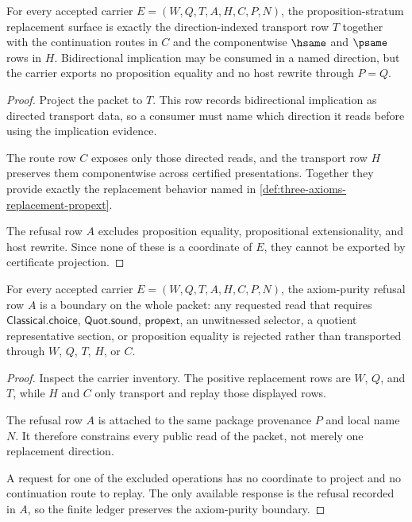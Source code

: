 \begin{theorem}
\label{thm:effective-replacement-ledger-propext-transport-row}
For every accepted carrier $E=(W,Q,T,A,H,C,P,N)$, the proposition-stratum replacement surface is exactly the direction-indexed transport row $T$ together with the continuation routes in $C$ and the componentwise $\hsame$ and $\psame$ rows in $H$. Bidirectional implication may be consumed in a named direction, but the carrier exports no proposition equality and no host rewrite through $P=Q$.
\end{theorem}
\begin{proof}
Project the packet to $T$. This row records bidirectional implication as directed transport data, so a consumer must name which direction it reads before using the implication evidence.

The route row $C$ exposes only those directed reads, and the transport row $H$ preserves them componentwise across certified presentations. Together they provide exactly the replacement behavior named in \autoref{def:three-axioms-replacement-propext}.

The refusal row $A$ excludes proposition equality, propositional extensionality, and host rewrite. Since none of these is a coordinate of $E$, they cannot be exported by certificate projection.
\end{proof}

\begin{theorem}
\label{thm:effective-replacement-ledger-axiom-purity-boundary}
For every accepted carrier $E=(W,Q,T,A,H,C,P,N)$, the axiom-purity refusal row $A$ is a boundary on the whole packet: any requested read that requires $\mathsf{Classical.choice}$, $\mathsf{Quot.sound}$, $\mathsf{propext}$, an unwitnessed selector, a quotient representative section, or proposition equality is rejected rather than transported through $W$, $Q$, $T$, $H$, or $C$.
\end{theorem}
\begin{proof}
Inspect the carrier inventory. The positive replacement rows are $W$, $Q$, and $T$, while $H$ and $C$ only transport and replay those displayed rows.

The refusal row $A$ is attached to the same package provenance $P$ and local name $N$. It therefore constrains every public read of the packet, not merely one replacement direction.

A request for one of the excluded operations has no coordinate to project and no continuation route to replay. The only available response is the refusal recorded in $A$, so the finite ledger preserves the axiom-purity boundary.
\end{proof}

